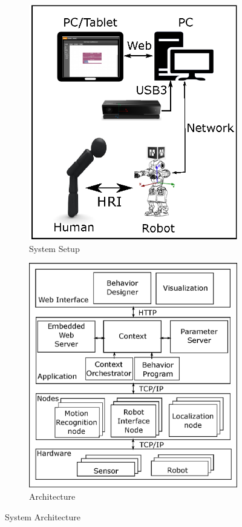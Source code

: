 \documentclass{llncs}
\begin{document}
\begin{figure}
\centering
\begin{subfigure}[t]{0.48\textwidth}
\includegraphics[width=\textwidth]{../thesis/assets/system_setup.eps}
\caption[System Setup]{System Setup}
\end{subfigure}
\begin{subfigure}[t]{0.48\textwidth}
\includegraphics[width=\textwidth]{../thesis/assets/architecture.eps}
\caption[System Architecture]{Architecture}
\end{subfigure}
\caption[System Architecture]{System Architecture}
\label{fig:architecture}
\end{figure}
%
\end{document}
